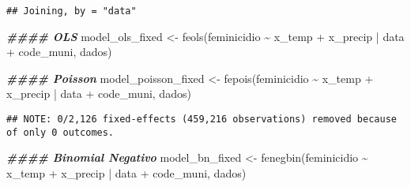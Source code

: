 \documentclass[
]{article}
\newenvironment{Shaded}{\begin{snugshade}}{\end{snugshade}}
\newcommand{\AttributeTok}[1]{\textcolor[rgb]{0.77,0.63,0.00}{#1}}
\newcommand{\CommentTok}[1]{\textcolor[rgb]{0.56,0.35,0.01}{\textit{#1}}}
\newcommand{\DocumentationTok}[1]{\textcolor[rgb]{0.56,0.35,0.01}{\textbf{\textit{#1}}}}
\newcommand{\FunctionTok}[1]{\textcolor[rgb]{0.00,0.00,0.00}{#1}}
\newcommand{\NormalTok}[1]{#1}
\newcommand{\OtherTok}[1]{\textcolor[rgb]{0.56,0.35,0.01}{#1}}
\newcommand{\SpecialCharTok}[1]{\textcolor[rgb]{0.00,0.00,0.00}{#1}}
\newcommand{\StringTok}[1]{\textcolor[rgb]{0.31,0.60,0.02}{#1}}
\begin{document}
\begin{verbatim}
## Joining, by = "data"
\end{verbatim}

\begin{Shaded}
\end{Shaded}

\begin{Shaded}
\begin{Highlighting}[]
\DocumentationTok{\#\#\#\# OLS}
\NormalTok{model\_ols\_fixed }\OtherTok{\textless{}{-}} \FunctionTok{feols}\NormalTok{(feminicidio  }\SpecialCharTok{\textasciitilde{}}\NormalTok{ x\_temp }\SpecialCharTok{+}\NormalTok{ x\_precip }\SpecialCharTok{|}\NormalTok{ data }\SpecialCharTok{+}\NormalTok{ code\_muni, dados)}

\DocumentationTok{\#\#\#\# Poisson}
\NormalTok{model\_poisson\_fixed }\OtherTok{\textless{}{-}} \FunctionTok{fepois}\NormalTok{(feminicidio  }\SpecialCharTok{\textasciitilde{}}\NormalTok{ x\_temp }\SpecialCharTok{+}\NormalTok{ x\_precip }\SpecialCharTok{|}\NormalTok{ data }\SpecialCharTok{+}\NormalTok{ code\_muni, dados)}
\end{Highlighting}
\end{Shaded}

\begin{verbatim}
## NOTE: 0/2,126 fixed-effects (459,216 observations) removed because of only 0 outcomes.
\end{verbatim}

\begin{Shaded}
\begin{Highlighting}[]
\DocumentationTok{\#\#\#\# Binomial Negativo}
\NormalTok{model\_bn\_fixed }\OtherTok{\textless{}{-}} \FunctionTok{fenegbin}\NormalTok{(feminicidio  }\SpecialCharTok{\textasciitilde{}}\NormalTok{ x\_temp }\SpecialCharTok{+}\NormalTok{ x\_precip }\SpecialCharTok{|}\NormalTok{ data }\SpecialCharTok{+}\NormalTok{ code\_muni, dados)}
\end{Highlighting}
\end{Shaded}
\end{document}
